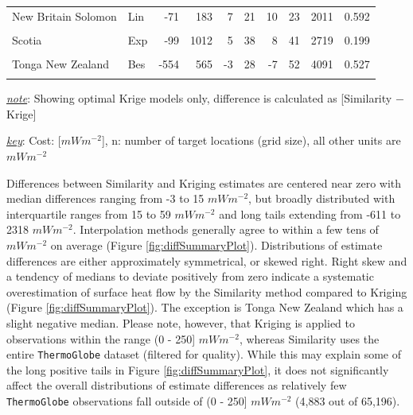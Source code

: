 \begin{table}
{\begin{threeparttable}
\begin{tabular}[t]{llrrrrrrrr}
New Britain Solomon & Lin & -71 & 183 & 7 & 21 & 10 & 23 & 2011 & 0.592\\
\cellcolor{gray!6}{S Philippines} & \cellcolor{gray!6}{Exp} & \cellcolor{gray!6}{-60} & \cellcolor{gray!6}{362} & \cellcolor{gray!6}{6} & \cellcolor{gray!6}{22} & \cellcolor{gray!6}{10} & \cellcolor{gray!6}{24} & \cellcolor{gray!6}{3174} & \cellcolor{gray!6}{0.466}\\
Scotia & Exp & -99 & 1012 & 5 & 38 & 8 & 41 & 2719 & 0.199\\
\cellcolor{gray!6}{Sumatra Banda Sea} & \cellcolor{gray!6}{Exp} & \cellcolor{gray!6}{-84} & \cellcolor{gray!6}{362} & \cellcolor{gray!6}{4} & \cellcolor{gray!6}{16} & \cellcolor{gray!6}{4} & \cellcolor{gray!6}{19} & \cellcolor{gray!6}{5932} & \cellcolor{gray!6}{0.263}\\
Tonga New Zealand & Bes & -554 & 565 & -3 & 28 & -7 & 52 & 4091 & 0.527\\
\cellcolor{gray!6}{Vanuatu} & \cellcolor{gray!6}{Lin} & \cellcolor{gray!6}{-152} & \cellcolor{gray!6}{1684} & \cellcolor{gray!6}{15} & \cellcolor{gray!6}{31} & \cellcolor{gray!6}{15} & \cellcolor{gray!6}{52} & \cellcolor{gray!6}{2508} & \cellcolor{gray!6}{0.502}\\
\bottomrule
\end{tabular}
\begin{tablenotes}
\item \uline{\textit{note}}: Showing optimal Krige models only, difference is calculated as [Similarity $-$ Krige]
\item \uline{\textit{key}}: Cost: [$mWm^{-2}$], n: number of target locations (grid size), all other units are $mWm^{-2}$
\end{tablenotes}
\end{threeparttable}}
\end{table}

Differences between Similarity and Kriging estimates are centered near zero with median differences ranging from -3 to 15 \(mWm^{-2}\), but broadly distributed with interquartile ranges from 15 to 59 \(mWm^{-2}\) and long tails extending from -611 to 2318 \(mWm^{-2}\). Interpolation methods generally agree to within a few tens of \(mWm^{-2}\) on average (Figure \ref{fig:diffSummaryPlot}). Distributions of estimate differences are either approximately symmetrical, or skewed right. Right skew and a tendency of medians to deviate positively from zero indicate a systematic overestimation of surface heat flow by the Similarity method compared to Kriging (Figure \ref{fig:diffSummaryPlot}). The exception is Tonga New Zealand which has a slight negative median. Please note, however, that Kriging is applied to observations within the range (0 - 250{]} \(mWm^{-2}\), whereas Similarity uses the entire \texttt{ThermoGlobe} dataset (filtered for quality). While this may explain some of the long positive tails in Figure \ref{fig:diffSummaryPlot}, it does not significantly affect the overall distributions of estimate differences as relatively few \texttt{ThermoGlobe} observations fall outside of (0 - 250{]} \(mWm^{-2}\) (4,883 out of 65,196).

